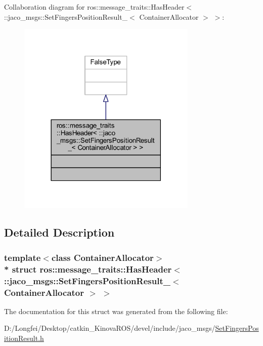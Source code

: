 Collaboration diagram for ros\+:\+:message\+\_\+traits\+:\+:Has\+Header$<$ \+:\+:jaco\+\_\+msgs\+:\+:Set\+Fingers\+Position\+Result\+\_\+$<$ Container\+Allocator $>$ $>$\+:
\nopagebreak
\begin{figure}[H]
\begin{center}
\leavevmode
\includegraphics[width=242pt]{d9/d47/structros_1_1message__traits_1_1HasHeader_3_01_1_1jaco__msgs_1_1SetFingersPositionResult___3_01C56e192bf6b09f64e08601ac8347f5e06}
\end{center}
\end{figure}


\subsection{Detailed Description}
\subsubsection*{template$<$class Container\+Allocator$>$\\*
struct ros\+::message\+\_\+traits\+::\+Has\+Header$<$ \+::jaco\+\_\+msgs\+::\+Set\+Fingers\+Position\+Result\+\_\+$<$ Container\+Allocator $>$ $>$}



The documentation for this struct was generated from the following file\+:\begin{DoxyCompactItemize}
\item 
D\+:/\+Longfei/\+Desktop/catkin\+\_\+\+Kinova\+R\+O\+S/devel/include/jaco\+\_\+msgs/\hyperlink{SetFingersPositionResult_8h}{Set\+Fingers\+Position\+Result.\+h}\end{DoxyCompactItemize}

